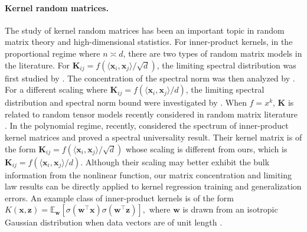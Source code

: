 \documentclass[twoside,11pt]{article}
\def\bK{{\boldsymbol K}}
\def\bx{{\boldsymbol x}}
\def\bz{{\boldsymbol z}}
\renewcommand{\bK}{\boldsymbol{K}}
\newcommand{\x}{\boldsymbol{x}}
\newcommand{\z}{\boldsymbol{z}}
\newcommand{\w}{\mbi{w}}
\newcommand{\1}{\mathbf{1}}
\def\mbi#1{\boldsymbol{#1}}
\def\mbi#1{\boldsymbol{#1}} %
\def\tran{^\top}
\newcommand{\Exp}{\mathbb{E}}
\begin{document}
\paragraph{Kernel random matrices.} The study of kernel random matrices has been an important topic in random matrix theory and high-dimensional statistics. For inner-product kernels, in the proportional regime where $n\asymp d$, there are two types of random matrix models in the literature. For $\bK_{ij}=f(\langle \bx_i, \bx_j\rangle /\sqrt{d})$, the limiting spectral distribution was first studied by \cite{cheng2013spectrum,do2013spectrum}. The concentration of the spectral norm was then analyzed by \cite{fan2019spectral}. For a different scaling where $\bK_{ij}=f(\langle \bx_i, \bx_j\rangle /d)$, the limiting spectral distribution and spectral norm bound were investigated by \cite{do2013spectrum,el2010spectrum,el2010information,amini2021concentration}.  When $f=x^k$,  $\bK$ is related to random tensor models recently considered in random matrix literature \citep{ambainis2012random,bryson2021marchenko,collins2022spectral,yaskov2023marchenko,baslingker2023hadamard,goulart2022random,au2023spectral}. 
In the polynomial regime, recently, \cite{lu2022equivalence,dubova2023universality} considered the spectrum of inner-product kernel matrices and proved a spectral universality result. Their kernel matrix is of the form $\bK_{ij}=f(\langle \bx_i, \bx_j\rangle /\sqrt{d})$ whose scaling is different from ours, which is $\bK_{ij}=f(\langle \bx_i, \bx_j\rangle /d)$. Although their scaling may better exhibit the bulk information from the nonlinear function, our matrix concentration and limiting law results can be directly applied to kernel regression training and generalization errors. An example class of inner-product kernels is of the form $K(\bx,\bz) = \Exp_{\w}[\sigma(\w\tran \x)\sigma(\w\tran \z)],$
where $\w$ is drawn from an isotropic Gaussian distribution when data vectors are of unit length \citep{wang2021deformed,murray2023characterizing}.  
\end{document}
